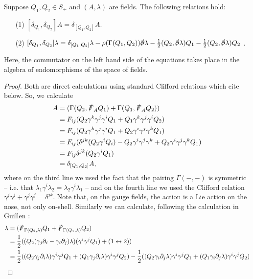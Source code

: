 \documentclass[10pt, oneside]{article}
\begin{document}
\begin{lemma}
Suppose $Q_1, Q_2 \in S_+$ and $(A, \lambda)$ are fields.
The following relations hold:
\begin{itemize}
\item[(1)] \label{10dsusyA} $ [\delta_{Q_1}, \delta_{Q_2}] A = \delta_{[Q_1, Q_2]} A$.
\item[(2)] \label{10dsusyL} $ [\delta_{Q_1}, \delta_{Q_2}] \lambda = \delta_{[Q_1,Q_2]} \lambda - \rho(\Gamma(Q_1,Q_2)) \sd \dd \lambda - \frac 12(Q_2, \sd \dd \lambda)Q_1 - \frac 12(Q_2, \sd \dd \lambda)Q_2$ .
\end{itemize}
Here, the commutator on the left hand side of the equations takes place in the algebra of endomorphisms of the space of fields.
\end{lemma}
\begin{proof}
Both are direct calculations using standard Clifford relations which cite below.
So, we calculate
\begin{align*}
[\delta_{Q_1}, \delta_{Q_2}] A &= (\Gamma(Q_2,\sd F_A Q_1) + \Gamma(Q_1,\sd F_A Q_2)) \\
&=  F_{ij}(Q_2 \gamma^k \gamma^j \gamma^i Q_1 + Q_1 \gamma^k \gamma^j \gamma^i Q_2) \\
&=  F_{ij}(Q_2 \gamma^k \gamma^j \gamma^i Q_1 + Q_2 \gamma^i \gamma^j \gamma^k Q_1)\\
&= F_{ij}(\delta^{jk}(Q_2\gamma^i Q_i) - Q_2 \gamma^i \gamma^j \gamma^k + Q_2 \gamma^i \gamma^j \gamma^k Q_1)\\
&=  F_{ij}\delta^{jk}(Q_2 \gamma^i Q_1) \\
&= \delta_{[Q_1, Q_2]} A,
\end{align*}
where on the third line we used the fact that the pairing $\Gamma(-,-)$ is symmetric -- i.e. that $\lambda_1 \gamma^i \lambda_2 = \lambda_2 \gamma^i \lambda_1$ -- and on the fourth line we used the Clifford relation $\gamma^j\gamma^j+\gamma^j\gamma^j = \delta^{jk}$.  Note that, on the gauge fields, the action is a Lie action on the nose, not only on-shell.  Similarly we can calculate, following the calculation in Guillen \cite{Guillen}:
\begin{align*}
[\delta_{Q_1}, \delta_{Q_2}] \lambda &= (\sd F_{\Gamma(Q_2, \lambda)} Q_1 + \sd F_{\Gamma(Q_1,\lambda)} Q_2) \\
&= \frac 12((Q_2 (\gamma_j \dd_i - \gamma_i \dd_j) \lambda) (\gamma^i \gamma^j Q_1) + (1 \leftrightarrow 2)) \\
&= \frac 12((Q_2 \gamma_j \dd_i \lambda) \gamma^i \gamma^j Q_1 + (Q_1 \gamma_j \dd_i \lambda) \gamma^i \gamma^j Q_2) - \frac 12((Q_2 \gamma_i \dd_j \lambda) \gamma^i \gamma^j Q_1 + (Q_1 \gamma_i \dd_j \lambda) \gamma^i \gamma^j Q_2) \\

\end{align*}
\end{proof}
\end{document}
